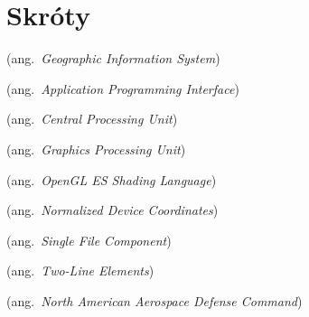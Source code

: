 \chapter*{Skróty}\mbox{}
\label{sec:skroty}
\noindent
\begin{description}[labelwidth=*]
  \item [GIS] (ang.\ \emph{Geographic Information System})
  \item [API] (ang.\ \emph{Application Programming Interface})
  \item [CPU] (ang.\ \emph{Central Processing Unit})
  \item [GPU] (ang.\ \emph{Graphics Processing Unit})
  \item [ESSL] (ang.\ \emph{OpenGL ES Shading Language})
  \item [NDC] (ang.\ \emph{Normalized Device Coordinates})
  \item [SFC] (ang.\ \emph{Single File Component})
  \item [TLE] (ang.\ \emph{Two-Line Elements})
  \item [NOARD] (ang.\ \emph{North American Aerospace Defense Command})
\end{description}
